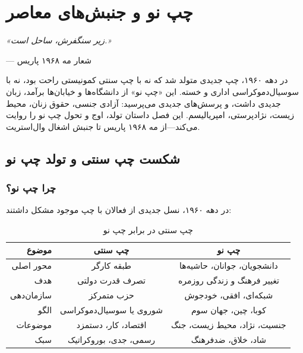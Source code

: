
\chapter{چپ نو و جنبش‌های معاصر}
\label{ch:new-left}

\begin{flushright}
\textit{«زیر سنگفرش، ساحل است.»}

— شعار مه ۱۹۶۸ پاریس
\end{flushright}


\lettrine[lines=3, lraise=0.1, nindent=0.5em]{\textcolor{PurpleAccent}{د}}{ر} 
دهه ۱۹۶۰، چپ جدیدی متولد شد که نه با چپ سنتی کمونیستی راحت بود، نه با سوسیال‌دموکراسی اداری و خسته. این «چپ نو» از دانشگاه‌ها و خیابان‌ها برآمد، زبان جدیدی داشت، و پرسش‌های جدیدی می‌پرسید: آزادی جنسی، حقوق زنان، محیط زیست، نژادپرستی، امپریالیسم. این فصل داستان تولد، اوج و تحول چپ نو را روایت می‌کند—از مه ۱۹۶۸ پاریس تا جنبش اشغال وال‌استریت.

\section{شکست چپ سنتی و تولد چپ نو}

\subsection{چرا چپ نو؟}

در دهه ۱۹۶۰، نسل جدیدی از فعالان با چپ موجود مشکل داشتند:

\begin{table}[htbp]
\centering
\caption{چپ سنتی در برابر چپ نو}
\label{tab:old-vs-new-left}
\begin{tabular}{r|c|c}
\toprule
\textbf{موضوع} & \textbf{چپ سنتی} & \textbf{چپ نو} \\
\midrule
محور اصلی & طبقه کارگر & دانشجویان، جوانان، حاشیه‌ها \\
هدف & تصرف قدرت دولتی & تغییر فرهنگ و زندگی روزمره \\
سازمان‌دهی & حزب متمرکز & شبکه‌ای، افقی، خودجوش \\
الگو & شوروی یا سوسیال‌دموکراسی & کوبا، چین، جهان سوم \\
موضوعات & اقتصاد، کار، دستمزد & جنسیت، نژاد، محیط زیست، جنگ \\
سبک & رسمی، جدی، بوروکراتیک & شاد، خلاق، ضدفرهنگ \\
\bottomrule
\end{tabular}
\end{table}

